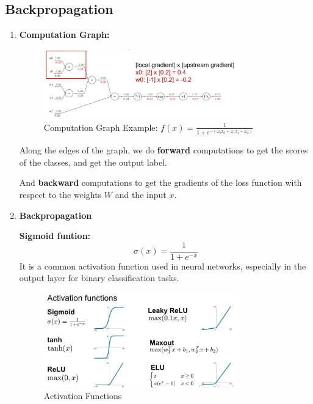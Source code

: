 \documentclass{article}
\numberwithin{equation}{section}
\begin{document}
\begin{CJK}{UTF8}{gbsn}
\subsection{Backpropagation}
\begin{enumerate}
    \item \textbf{Computation Graph:}\par
    \begin{figure}[h]
        \centering
        \includegraphics[width=0.8\textwidth]{images/Lecture4/computation_graph.png}
        \caption{Computation Graph Example: \(f(x) = \frac{1}{1 + e^{-(\omega_0 x_0 + \omega_1 x_1 + \omega_2)}}\)}
        \label{fig:computation_graph}
    \end{figure}
    Along the edges of the graph, we do \textbf{forward} computations to get the scores of the classes, and get the output label.\par
    And \textbf{backward} computations to get the gradients of the loss function with respect to the weights \(W\) and the input \(x\).\par


    \item \textbf{Backpropagation}\par

        \textbf{Sigmoid funtion:}
        \begin{equation}
            \sigma(x) = \frac{1}{1 + e^{-x}}
        \end{equation}
        It is a common activation function used in neural networks, especially in the output layer for binary classification tasks.\par
        \begin{figure}[h]
            \centering
            \includegraphics[width=0.8\textwidth]{images/Lecture4/activation_functions.png}
            \caption{Activation Functions}
            \label{fig:activation_functions}
        \end{figure}


\end{enumerate}
\end{CJK}
\end{document}
